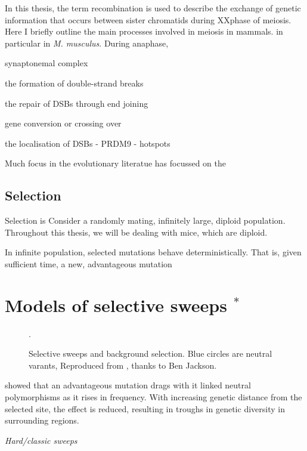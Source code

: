 	In this thesis, the term recombination is used to describe the exchange of genetic information that occurs between sister chromatids during XXphase of meiosis. Here I briefly outline the main processes involved in meiosis in mammals. in particular in \textit{M. musculus}. During anaphase, 
	
	synaptonemal complex

	the formation of double-strand breaks

	the repair of DSBs through end joining 

	gene conversion or crossing over

	the localisation of DSBs - PRDM9 - hotspots

	Much focus in the evolutionary literatue has focussed on the 
		
	
	\subsection{Selection}

	Selection is 
	Consider a randomly mating, infinitely large, diploid population. 
	Throughout this thesis, we will be dealing with mice, which are diploid.

	In infinite population, selected mutations behave deterministically. That is, given sufficient time, a new, advantageous mutation 
	

\section[Models of selective sweeps]{Models of selective sweeps $^*$}
\begin{figure}[h]
   \centering      
   \noindent{}
 \caption[Selective sweeps and background selection]{Selective sweeps and background selection. Blue circles are neutral varants, Reproduced from \cite{RN352}, thanks to Ben Jackson.}.
 
 \label{fig:sweepCartoon}
\end{figure}

\cite{RN124} showed that an advantageous mutation drags with it linked neutral polymorphisms as it rises in frequency. With increasing genetic distance from the selected site, the effect is reduced, resulting in troughs in genetic diversity in surrounding regions.
 
\emph{Hard/classic sweeps} \\
 
